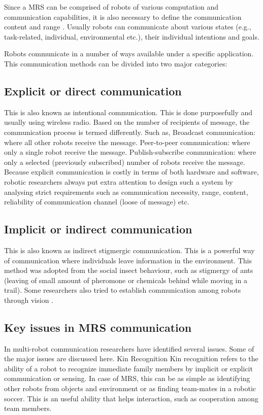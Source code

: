 Since a MRS  can be comprised of robots of various computation and communication capabilities, it is also necessary to define the communication content and range \cite{Arkin1998,Mataric2007}. Usually robots can communicate about various states (e.g., task-related, individual, environmental etc.), their individual intentions and goals. 
 
Robots communicate in a number of ways available under a specific application. This communication methods can be divided into two major categories:

\subsection{Explicit or direct communication}
This is also known as intentional communication. This is done purposefully and usually using wireless radio. Based on the number of recipients of message, the communication process is termed differently. Such as,
Broadcast communication: where all other robots receive the message.
Peer-to-peer communication: where only a single robot receive the message.
Publish-subscribe communication: where only a selected (previously subscribed) number of robots receive the message.
Because explicit communication is costly in terms of both hardware and software, robotic researchers always put extra attention to design such a system by analysing strict requirements such as communication necessity, range, content, reliability of communication channel (loose of message) etc.

\subsection{Implicit or indirect communication} 
This is also known as indirect stigmergic communication. This is a powerful way of communication where individuals leave information in the environment. This method was adopted from the social insect behaviour, such as stigmergy of ants (leaving of small amount of pheromone or chemicals behind while moving in a trail). Some researchers also tried to establish communication among robots through vision \cite{Kuniyoshi1994}.

\subsection{Key issues in MRS communication}
In multi-robot communication researchers have identified several issues. Some of the major issues are discussed here.
Kin Recognition
Kin recognition refers to the ability of a robot to recognize immediate family members by implicit or explicit communication or sensing. In case of MRS, this can be as simple as identifying other robots from objects and environment or as finding team-mates in a robotic soccer. This is an useful ability that helps interaction, such as cooperation among team members. 

